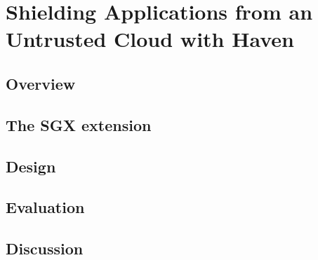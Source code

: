 \section{Shielding Applications from an Untrusted Cloud with Haven}

\subsection{Overview}

\subsection{The SGX extension}


\subsection{Design}

\subsection{Evaluation}

\subsection{Discussion}
